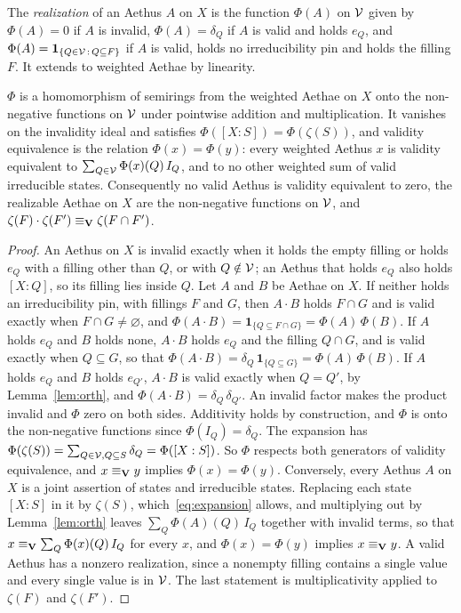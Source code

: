 \begin{definition}\label{def:realization}
The \emph{realization} of an Aethus $A$ on $X$ is the function $\Phi(A)$ on $\mathcal{V}$ given by $\Phi(A) = 0$ if $A$ is invalid, $\Phi(A) = \delta_Q$ if $A$ is valid and holds $e_Q$, and $\Phi(A) = \mathbf{1}_{\{Q \in \mathcal{V} \,:\, Q \subseteq F\}}$ if $A$ is valid, holds no irreducibility pin and holds the filling $F$. It extends to weighted Aethae by linearity.
\end{definition}

\begin{theorem}[Realization]\label{thm:realization}
$\Phi$ is a homomorphism of semirings from the weighted Aethae on $X$ onto the non-negative functions on $\mathcal{V}$ under pointwise addition and multiplication. It vanishes on the invalidity ideal and satisfies $\Phi([X:S]) = \Phi(\zeta(S))$, and validity equivalence is the relation $\Phi(x) = \Phi(y)$: every weighted Aethus $x$ is validity equivalent to $\sum_{Q \in \mathcal{V}} \Phi(x)(Q)\, I_Q$, and to no other weighted sum of valid irreducible states. Consequently no valid Aethus is validity equivalent to zero, the realizable Aethae on $X$ are the non-negative functions on $\mathcal{V}$, and $\zeta(F)\cdot\zeta(F') \equiv_{\mathbf{V}} \zeta(F \cap F')$.
\end{theorem}

\begin{proof}
An Aethus on $X$ is invalid exactly when it holds the empty filling or holds $e_Q$ with a filling other than $Q$, or with $Q \notin \mathcal{V}$; an Aethus that holds $e_Q$ also holds $[X:Q]$, so its filling lies inside $Q$. Let $A$ and $B$ be Aethae on $X$. If neither holds an irreducibility pin, with fillings $F$ and $G$, then $A \cdot B$ holds $F \cap G$ and is valid exactly when $F \cap G \neq \varnothing$, and $\Phi(A\cdot B) = \mathbf{1}_{\{Q \subseteq F \cap G\}} = \Phi(A)\,\Phi(B)$. If $A$ holds $e_Q$ and $B$ holds none, $A \cdot B$ holds $e_Q$ and the filling $Q \cap G$, and is valid exactly when $Q \subseteq G$, so that $\Phi(A \cdot B) = \delta_Q \, \mathbf{1}_{\{Q \subseteq G\}} = \Phi(A)\,\Phi(B)$. If $A$ holds $e_Q$ and $B$ holds $e_{Q'}$, $A \cdot B$ is valid exactly when $Q = Q'$, by Lemma~\ref{lem:orth}, and $\Phi(A\cdot B) = \delta_Q\,\delta_{Q'}$. An invalid factor makes the product invalid and $\Phi$ zero on both sides. Additivity holds by construction, and $\Phi$ is onto the non-negative functions since $\Phi(I_Q) = \delta_Q$. The expansion has $\Phi(\zeta(S)) = \sum_{Q \in \mathcal{V}, Q \subseteq S} \delta_Q = \Phi([X:S])$. So $\Phi$ respects both generators of validity equivalence, and $x \equiv_{\mathbf{V}} y$ implies $\Phi(x) = \Phi(y)$. Conversely, every Aethus $A$ on $X$ is a joint assertion of states and irreducible states. Replacing each state $[X:S]$ in it by $\zeta(S)$, which~\eqref{eq:expansion} allows, and multiplying out by Lemma~\ref{lem:orth} leaves $\sum_Q \Phi(A)(Q)\, I_Q$ together with invalid terms, so that $x \equiv_{\mathbf{V}} \sum_Q \Phi(x)(Q)\, I_Q$ for every $x$, and $\Phi(x) = \Phi(y)$ implies $x \equiv_{\mathbf{V}} y$. A valid Aethus has a nonzero realization, since a nonempty filling contains a single value and every single value is in $\mathcal{V}$. The last statement is multiplicativity applied to $\zeta(F)$ and $\zeta(F')$.
\end{proof}

